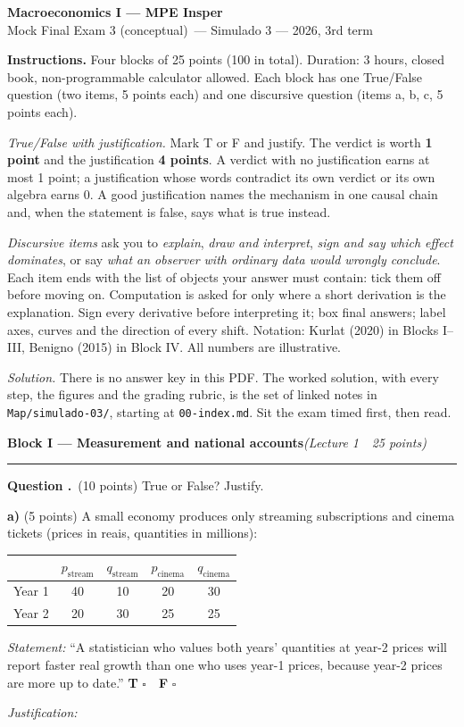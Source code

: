 \documentclass[11pt,a4paper]{article}
\newcommand{\disciplina}{Macroeconomics I --- MPE Insper}
\newcommand{\listatema}{Mock Final Exam 3 (conceptual)}
\newcounter{questao}
\newcommand{\bloco}[3]{\Needspace{10\baselineskip}\bigskip\noindent
  {\large\bfseries\color{blue!55!black}Block #1 --- #2}\hfill\textit{(#3)}\par
  \noindent\rule{\linewidth}{0.3pt}\smallskip}
\newcommand{\questao}[1]{\Needspace{16\baselineskip}\refstepcounter{questao}\medskip\noindent
  \textbf{Question \thequestao.}~#1\par}
\newcommand{\vf}[2]{\Needspace{9\baselineskip}\par\medskip\noindent\textbf{#1)} (5 points) #2
  \quad\textbf{T} $\square$\ \ \textbf{F} $\square$\par\noindent\textit{Justification:}\vspace{4.6cm}\par}
\begin{document}
\begin{center}
  {\Large\bfseries \disciplina}\\[2pt]
  {\large \listatema\ --- Simulado 3 --- 2026, 3rd term}
\end{center}
\vspace{2pt}

{\footnotesize\noindent\textbf{Instructions.} Four blocks of 25 points (100 in total). Duration: 3 hours,
closed book, non-programmable calculator allowed. Each block has one True/False question (two items,
5 points each) and one discursive question (items a, b, c, 5 points each).

\smallskip\noindent\emph{True/False with justification.} Mark T or F and justify. The verdict is worth
\textbf{1 point} and the justification \textbf{4 points}. A verdict with no justification earns at most 1
point; a justification whose words contradict its own verdict or its own algebra earns 0. A good
justification names the mechanism in one causal chain and, when the statement is false, says what is true
instead.

\smallskip\noindent\emph{Discursive items} ask you to \emph{explain}, \emph{draw and interpret},
\emph{sign and say which effect dominates}, or say \emph{what an observer with ordinary data would wrongly
conclude}. Each item ends with the list of objects your answer must contain: tick them off before moving
on. Computation is asked for only where a short derivation is the explanation. Sign every derivative before
interpreting it; box final answers; label axes, curves and the direction of every shift.
Notation: Kurlat (2020) in Blocks I--III, Benigno (2015) in Block IV. All numbers are illustrative.

\smallskip\noindent\emph{Solution.} There is no answer key in this PDF. The worked solution, with every step,
the figures and the grading rubric, is the set of linked notes in \texttt{Map/simulado-03/}, starting at
\texttt{00-index.md}. Sit the exam timed first, then read.\par}

\bloco{I}{Measurement and national accounts}{Lecture 1 \,\textbullet\, 25 points}

\questao{(10 points) True or False? Justify.}

\vf{a}{A small economy produces only streaming subscriptions and cinema tickets (prices in reais,
quantities in millions):
\begin{center}\small
\begin{tabular}{lcccc}\toprule
 & $p_{\text{stream}}$ & $q_{\text{stream}}$ & $p_{\text{cinema}}$ & $q_{\text{cinema}}$\\\midrule
Year 1 & 40 & 10 & 20 & 30\\
Year 2 & 20 & 30 & 25 & 25\\\bottomrule
\end{tabular}
\end{center}
\emph{Statement:} ``A statistician who values both years' quantities at year-2 prices will report faster
real growth than one who uses year-1 prices, because year-2 prices are more up to date.''}
\end{document}
